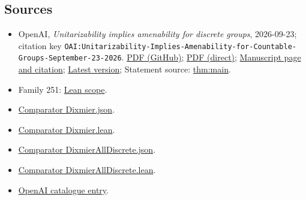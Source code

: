 \documentclass[11pt]{article}
\begin{document}
\subsection{Sources}
\begin{itemize}
\item OpenAI, \emph{Unitarizability implies amenability for discrete groups}, 2026-09-23; citation key \texttt{OAI:Unitarizability-Implies-Amenability-for-Countable-Groups-September-23-2026}. \href{https://github.com/openai/math/blob/adc7f1241b42e322a6451854ab7e4b4c146bf78a/preprints/Unitarizability-Implies-Amenability-for-Countable-Groups-September-23-2026/paper.pdf}{PDF (GitHub)}; \href{https://github.com/openai/math/raw/adc7f1241b42e322a6451854ab7e4b4c146bf78a/preprints/Unitarizability-Implies-Amenability-for-Countable-Groups-September-23-2026/paper.pdf}{PDF (direct)}; \href{https://github.com/openai/math/blob/adc7f1241b42e322a6451854ab7e4b4c146bf78a/preprints/Unitarizability-Implies-Amenability-for-Countable-Groups-September-23-2026/README.md}{Manuscript page and citation}; \href{https://github.com/openai/math/blob/main/preprints/Unitarizability-Implies-Amenability-for-Countable-Groups-September-23-2026/paper.pdf}{Latest version}; Statement source: \href{https://github.com/openai/math/blob/adc7f1241b42e322a6451854ab7e4b4c146bf78a/preprints/Unitarizability-Implies-Amenability-for-Countable-Groups-September-23-2026/build/sections/introduction.tex\#L38}{thm:main}.
\item Family 251: \href{https://github.com/openai/math/blob/adc7f1241b42e322a6451854ab7e4b4c146bf78a/lean/docs/251.md}{Lean scope}.
\item \href{https://github.com/openai/math/blob/adc7f1241b42e322a6451854ab7e4b4c146bf78a/lean/ComparatorChallenges/Dixmier.json}{Comparator Dixmier.json}.
\item \href{https://github.com/openai/math/blob/adc7f1241b42e322a6451854ab7e4b4c146bf78a/lean/ComparatorChallenges/Dixmier.lean}{Comparator Dixmier.lean}.
\item \href{https://github.com/openai/math/blob/adc7f1241b42e322a6451854ab7e4b4c146bf78a/lean/ComparatorChallenges/DixmierAllDiscrete.json}{Comparator DixmierAllDiscrete.json}.
\item \href{https://github.com/openai/math/blob/adc7f1241b42e322a6451854ab7e4b4c146bf78a/lean/ComparatorChallenges/DixmierAllDiscrete.lean}{Comparator DixmierAllDiscrete.lean}.
\item \href{https://github.com/openai/math/blob/adc7f1241b42e322a6451854ab7e4b4c146bf78a/CONTENTS.md}{OpenAI catalogue entry}.
\end{itemize}
\end{document}
